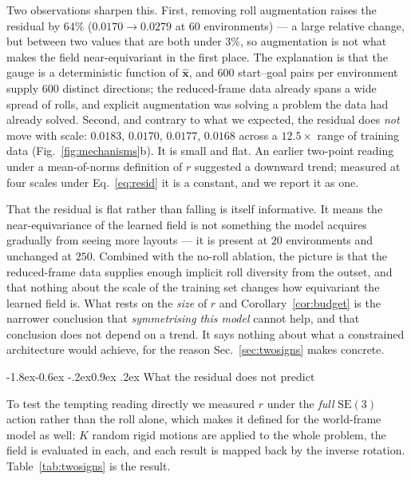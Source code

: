 \documentclass[10pt,twocolumn,letterpaper]{article}
\makeatletter
\renewcommand\subsection{\@startsection{subsection}{2}{\z@}%
  {-1.8ex\@plus -0.6ex \@minus -.2ex}{0.9ex \@plus .2ex}%
  {\normalfont\normalsize\bfseries}}
\theoremstyle{plain}
\newcommand{\xhat}{\hat{\mathbf{x}}}
\newcommand{\SE}{\mathrm{SE}(3)}
\makeatother
\begin{document}
Two observations sharpen this. First, removing roll augmentation raises the
residual by $64\%$ ($0.0170\!\to\!0.0279$ at $60$ environments) --- a large
relative change, but between two values that are both under $3\%$, so
augmentation is not what makes the field near-equivariant in the first place. The explanation is that the
gauge is a deterministic function of $\xhat$, and $600$ start--goal pairs per
environment supply $600$ distinct directions; the reduced-frame data already spans
a wide spread of rolls, and explicit augmentation was solving a problem the data
had already solved. Second, and contrary to what we expected, the residual does
\emph{not} move with scale: $0.0183$, $0.0170$, $0.0177$, $0.0168$ across a
$12.5\times$ range of training data (Fig.~\ref{fig:mechanisms}b). It is small and
flat. An earlier two-point reading under a mean-of-norms definition of $r$
suggested a downward trend; measured at four scales under Eq.~\eqref{eq:resid} it
is a constant, and we report it as one.

That the residual is flat rather than falling is itself informative. It means
the near-equivariance of the learned field is not something the model acquires
gradually from seeing more layouts --- it is present at $20$ environments and
unchanged at $250$. Combined with the no-roll ablation, the picture is that the
reduced-frame data supplies enough implicit roll diversity from the outset, and
that nothing about the scale of the training set changes how equivariant the
learned field is. What rests on the \emph{size} of $r$ and
Corollary~\ref{cor:budget} is the narrower conclusion that \emph{symmetrising
this model} cannot help, and that conclusion does not depend on a trend. It says
nothing about what a constrained architecture would achieve, for the reason
Sec.~\ref{sec:twosigns} makes concrete.

\subsection{What the residual does not predict}
\label{sec:twosigns}

To test the tempting reading directly we measured $r$ under the \emph{full}
$\SE$ action rather than the roll alone, which makes it defined for the
world-frame model as well: $K$ random rigid motions are applied to the whole
problem, the field is evaluated in each, and each result is mapped back by the
inverse rotation. Table~\ref{tab:twosigns} is the result.
\end{document}
